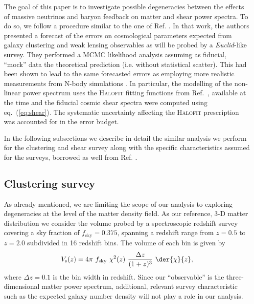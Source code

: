 \documentclass[a4paper,11pt]{article}
\newcommand{\be}{\begin{equation}}
\newcommand{\ee}{\end{equation}}
\newcommand{\eq}[1]{eq.~(\ref{#1})}
\begin{document}
{The goal of this paper is to investigate possible degeneracies between the effects of massive neutrinos and baryon feedback on matter and shear power spectra. To do so, we follow a procedure similar to the one of Ref. \citep{Audren+12}.  In that work, the authors presented a forecast of the errors on cosmological parameters expected from galaxy clustering and weak lensing observables as will be probed by a \textit{Euclid}-like survey. They performed a MCMC likelihood analysis assuming as fiducial, ``mock'' data the theoretical prediction (i.e. without statistical scatter). This had been shown to lead to the same forecasted errors as employing more realistic measurements from N-body simulations \cite{Perotto+06}. In particular, the modelling of the non-linear power spectrum uses the \textsc{Halofit} fitting functions from Ref.~\cite{Bird-HALOFIT+12}, available at the time and the fiducial cosmic shear spectra were computed using \eq{eq:shear}.  The systematic uncertainty affecting the \textsc{Halofit} prescription was accounted for in the error budget.

In the following subsections we describe in detail the similar analysis we perform for the clustering and shear survey along with the specific characteristics assumed for the surveys, borrowed as well from Ref. \cite{Audren+12}.



\subsection{Clustering survey}

As already mentioned, we are limiting the scope of our analysis to exploring degeneracies at the level of the matter density field. As our reference, 3-D matter distribution we consider the volume probed by a spectroscopic redshift survey covering a sky fraction of $f_\textrm{sky} = 0.375$, spanning a redshift range from   $z = 0.5$ to $z= 2.0$ subdivided in 16 redshift bins. The volume of each bin is given by
\be
V_\mathrm s(z) = 4\pi \ f_\textrm{sky} \ \chi^2(z) \ \frac{\Delta z}{(1+z)^3} \ \der{\chi}{z},
\label{eq:volume_survey}
\ee
where $\Delta z = 0.1$ is the bin width in redshift. Since our ``observable'' is the three-dimensional matter power spectrum, additional, relevant survey characteristic such as the expected galaxy number density will not play a role in our analysis.

}
\end{document}
